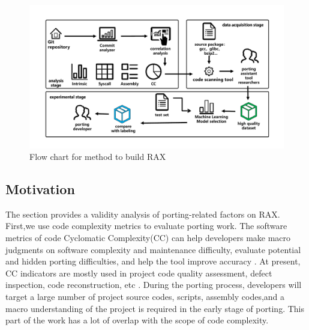 \documentclass[sigconf,screen,review]{acmart}
\begin{document}
\begin{figure}
  \centering
  \includegraphics[width=\linewidth]{flow-chart.pdf}
  \caption{Flow chart for method to build RAX}
  \label{fig:flow-chart}
\end{figure}

\subsection{Motivation}
The section provides a validity analysis of porting-related factors on RAX.
First,we use code complexity metrics to evaluate porting work.
The software metrics of code Cyclomatic Complexity(CC) can help developers make macro judgments on software complexity and maintenance difficulty, evaluate potential and hidden porting difficulties, and help the tool improve accuracy \cite{2005Exploring}.
At present, CC indicators are mostly used in project code quality assessment, defect inspection, code reconstruction, etc \cite{1991Cyclomatic}.
During the porting process, developers will target a large number of project source codes, scripts, assembly codes,and a macro understanding of the project is required in the early stage of porting.
This part of the work has a lot of overlap with the scope of code complexity.
\end{document}
